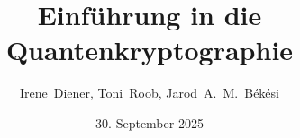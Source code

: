 %
%
\author[Diener, Roob, B{\'e}k{\'e}si]
{Irene~Diener, Toni~Roob, Jarod~A.~M.~B{\'e}k{\'e}si}
\newcommand{\myTitle}{Einf{\"u}hrung in die Quantenkryptographie}
\newcommand{\myTitleShort}{Quantenkryptographie}
\title[\myTitleShort]{\myTitle}
\newcommand{\myProf}{Prof.~Dr.~habil.~Andriy~Luntovskyy}
\newcommand{\myAcademy}{Duale Hochschule Sachsen}
\newcommand{\myStudy}{Studiengang Informationstechnik}
\newcommand{\myLocation}{Dresden} 
\newcommand{\myVersion}{Version 1.0}
\newcommand{\mySubmissionDate}{30. September 2025}


%
%
\usepackage[utf8]{inputenc}
\usepackage[T1]{fontenc}
\usepackage{lmodern}

\usepackage{hyphenat}
\usepackage[ngerman,english]{babel}
\usepackage[babel]{csquotes}
\usepackage{cite}
\usepackage{amsmath,amssymb,amstext,amsthm}
\usepackage{upgreek,units}

\usepackage{ragged2e}
\usepackage{animate}

\usepackage{graphicx}
\usepackage{caption,subcaption}

\usepackage[hang,multiple]{footmisc}
\renewcommand{\footnotemargin}{1.2em}
\usepackage{longtable,booktabs,multirow,colortbl}
\usepackage{rotating}
\usepackage{remreset}

\usepackage{enumerate}
\usepackage[shortlabels]{enumitem}

%
%
\date{\mySubmissionDate}


